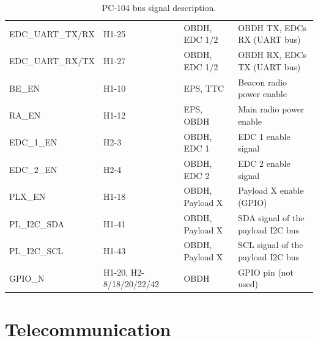 \begin{table}[!h]
\begin{tabular}{lL{0.18\textwidth}L{0.17\textwidth}L{0.33\textwidth}}
        EDC\_UART\_TX/RX & H1-25           & OBDH, EDC 1/2        & OBDH TX, EDCs RX (UART bus) \\
        EDC\_UART\_RX/TX & H1-27           & OBDH, EDC 1/2        & OBDH RX, EDCs TX (UART bus) \\
        BE\_EN           & H1-10           & EPS, TTC             & Beacon radio power enable \\
        RA\_EN           & H1-12           & EPS, OBDH            & Main radio power enable \\
        EDC\_1\_EN       & H2-3            & OBDH, EDC 1          & EDC 1 enable signal \\
        EDC\_2\_EN       & H2-4            & OBDH, EDC 2          & EDC 2 enable signal \\
        PLX\_EN          & H1-18           & OBDH, Payload X      & Payload X enable (GPIO) \\
        PL\_I2C\_SDA     & H1-41           & OBDH, Payload X      & SDA signal of the payload I2C bus \\
        PL\_I2C\_SCL     & H1-43           & OBDH, Payload X      & SCL signal of the payload I2C bus \\
        GPIO\_N          & H1-20, H2-8/18/20/22/42  & OBDH        & GPIO pin (not used) \\
        \bottomrule[1.5pt]
    \end{tabular}
    \caption{PC-104 bus signal description.}
    \label{tab:pc104-signals}
\end{table}

\section{Telecommunication}


